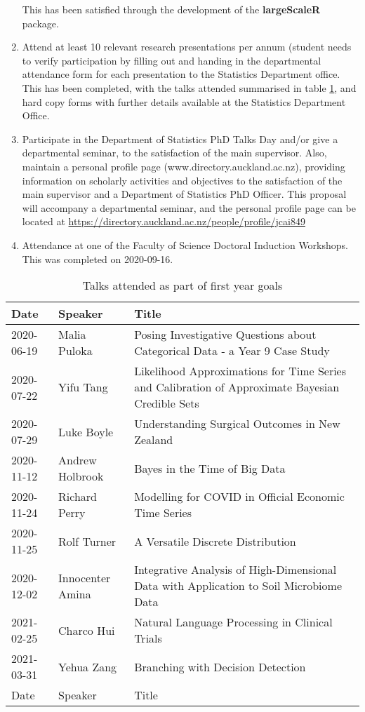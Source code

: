 \documentclass[a4paper,10pt]{article}
\begin{document}
\begin{enumerate}
		This has been satisfied through the development of the \textbf{largeScaleR} package.
	\item Attend at least 10 relevant research presentations per annum (student needs to verify participation by filling out and handing in the departmental attendance form for each presentation to the Statistics Department office.
		This has been completed, with the talks attended summarised in table \ref{talks}, and hard copy forms with further details available at the Statistics Department Office.
	\item Participate in the Department of Statistics PhD Talks Day and/or give a departmental seminar, to the satisfaction of the main supervisor. 
		Also, maintain a personal profile page (www.directory.auckland.ac.nz), providing information on scholarly activities and objectives to the satisfaction of the main supervisor and a Department of Statistics PhD Officer.
		This proposal will accompany a departmental seminar, and the personal profile page can be located at \url{https://directory.auckland.ac.nz/people/profile/jcai849}
	\item Attendance at one of the Faculty of Science Doctoral Induction Workshops.
		This was completed  on 2020-09-16.
\end{enumerate}

\begin{table}[h]
	\centering
	\begin{tabularx}{\textwidth}{llX}
		\toprule
		Date & Speaker & Title\\
		\midrule
		2020-06-19 & Malia Puloka & Posing Investigative Questions about Categorical Data - a Year 9 Case Study\\
		2020-07-22 & Yifu Tang & Likelihood Approximations for Time Series and Calibration of Approximate Bayesian Credible Sets\\
		2020-07-29 & Luke Boyle & Understanding Surgical Outcomes in New Zealand\\
		2020-11-12 & Andrew Holbrook & Bayes in the Time of Big Data\\
		2020-11-24 & Richard Perry & Modelling for COVID in Official Economic Time Series\\
		2020-11-25 & Rolf Turner & A Versatile Discrete Distribution\\
		2020-12-02 & Innocenter Amina & Integrative Analysis of High-Dimensional Data with Application to Soil Microbiome Data\\
		2021-02-25 & Charco Hui & Natural Language Processing in Clinical Trials\\
		2021-03-31 & Yehua Zang & Branching with Decision Detection\\
		Date & Speaker & Title\\
		\bottomrule
	\end{tabularx}
	\caption{\label{talks}Talks attended as part of first year goals}
\end{table}
\end{document}
